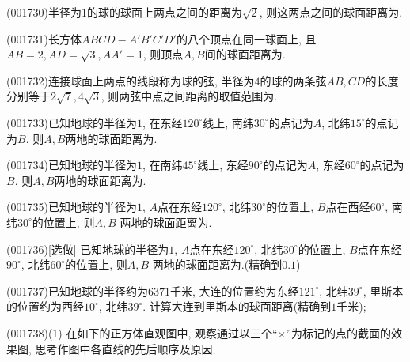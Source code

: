 \item (001730)半径为$1$的球的球面上两点之间的距离为$\sqrt{2}$, 则这两点之间的球面距离为.
\item (001731)长方体$ABCD-A'B'C'D'$的八个顶点在同一球面上, 且$AB=2,AD=\sqrt{3},AA'=1$, 则顶点$A,B$间的球面距离为.
\item (001732)连接球面上两点的线段称为球的弦, 半径为$4$的球的两条弦$AB,CD$的长度分别等于$2\sqrt{7},4\sqrt{3}$, 则两弦中点之间距离的取值范围为.
\item (001733)已知地球的半径为$1$, 在东经$120^\circ$线上, 南纬$30^\circ$的点记为$A$, 北纬$15^\circ$的点记为$B$. 则$A,B$两地的球面距离为.
\item (001734)已知地球的半径为$1$, 在南纬$45^\circ$线上, 东经$90^\circ$的点记为$A$, 东经$60^\circ$的点记为$B$. 则$A,B$两地的球面距离为.
\item (001735)已知地球的半径为$1$, $A$点在东经$120^\circ$, 北纬$30^\circ$的位置上, $B$点在西经$60^\circ$, 南纬$30^\circ$的位置上, 则$A,B$ 两地的球面距离为.
\item (001736)[选做]
已知地球的半径为$1$, $A$点在东经$120^\circ$, 北纬$30^\circ$的位置上, $B$点在东经$90^\circ$, 北纬$60^\circ$的位置上, 则$A,B$ 两地的球面距离为.(精确到$0.1$)
\item (001737)已知地球的半径约为$6371$千米, 大连的位置约为东经$121^\circ$, 北纬$39^\circ$, 里斯本的位置约为西经$10^\circ$, 北纬$39^\circ$.
计算大连到里斯本的球面距离(精确到$1$千米);
\item (001738)(1) 在如下的正方体直观图中, 观察通过以三个``$\times$''为标记的点的截面的效果图, 思考作图中各直线的先后顺序及原因;\\ 
